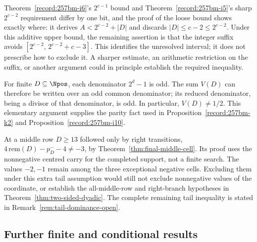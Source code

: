 \begin{obs}\label{record:257bm-k10}
Theorem~\ref{record:257bm-i6}'s $2^{c-1}$ bound and Theorem~\ref{record:257bm-i5}'s sharp $2^{c-2}$ requirement differ by one bit, and the
proof of the loose bound shows exactly where: it derives $A<2^{c-2}+|D|$ and discards
$|D|\le c-2\le2^{c-2}$. Under this additive upper bound, the remaining assertion is that the
integer suffix avoids $[2^{c-2},\,2^{c-2}+c-3]$.  This identifies the
unresolved interval; it does not prescribe how to exclude it.  A sharper
estimate, an arithmetic restriction on the suffix, or another argument
could in principle establish the required inequality.
\par\noindent   {}
\end{obs}

\begin{obs}\label{record:257bm-k11}
For finite $D\subseteq\Npos$, each denominator $2^d-1$ is odd.
The sum $V(D)$ can therefore be written over an odd common denominator;
its reduced denominator, being a divisor of that denominator, is odd.
In particular, $V(D)\ne1/2$.  This elementary argument supplies the
parity fact used in Proposition~\ref{record:257bm-k2} and
Proposition~\ref{record:257bm-i10}.
\par\noindent   {}
\end{obs}

\begin{thm}\label{record:257hg-k12}
At a middle row $D\ge13$ followed only by right transitions,
$4\,\mathrm{rem}(D)-p_D^--4\ne-3$, by
Theorem~\ref{thm:final-middle-cell}.  Its proof uses the nonnegative
centred carry for the completed support, not a finite search.
The values $-2,-1$ remain among the three exceptional negative cells.
Excluding them under this extra tail assumption would still not
exclude nonnegative values of the coordinate, or establish the
all-middle-row and right-branch hypotheses in
Theorem~\ref{thm:two-sided-dyadic}.  The complete remaining tail
inequality is stated in Remark~\ref{rem:tail-dominance-open}.
\end{thm}
\subsection{Further finite and conditional results}

